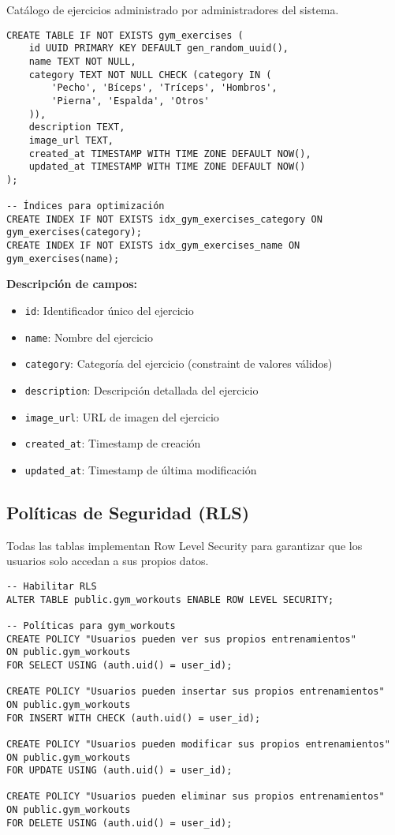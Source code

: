\documentclass[12pt,a4paper]{article}
\begin{document}
Catálogo de ejercicios administrado por administradores del sistema.

\begin{lstlisting}[style=sqlstyle, caption=Estructura completa de gym_exercises]
CREATE TABLE IF NOT EXISTS gym_exercises (
    id UUID PRIMARY KEY DEFAULT gen_random_uuid(),
    name TEXT NOT NULL,
    category TEXT NOT NULL CHECK (category IN (
        'Pecho', 'Bíceps', 'Tríceps', 'Hombros', 
        'Pierna', 'Espalda', 'Otros'
    )),
    description TEXT,
    image_url TEXT,
    created_at TIMESTAMP WITH TIME ZONE DEFAULT NOW(),
    updated_at TIMESTAMP WITH TIME ZONE DEFAULT NOW()
);

-- Índices para optimización
CREATE INDEX IF NOT EXISTS idx_gym_exercises_category ON gym_exercises(category);
CREATE INDEX IF NOT EXISTS idx_gym_exercises_name ON gym_exercises(name);
\end{lstlisting}

\textbf{Descripción de campos:}
\begin{itemize}
    \item \texttt{id}: Identificador único del ejercicio
    \item \texttt{name}: Nombre del ejercicio
    \item \texttt{category}: Categoría del ejercicio (constraint de valores válidos)
    \item \texttt{description}: Descripción detallada del ejercicio
    \item \texttt{image\_url}: URL de imagen del ejercicio
    \item \texttt{created\_at}: Timestamp de creación
    \item \texttt{updated\_at}: Timestamp de última modificación
\end{itemize}

\subsection{Políticas de Seguridad (RLS)}

Todas las tablas implementan Row Level Security para garantizar que los usuarios solo accedan a sus propios datos.

\begin{lstlisting}[style=sqlstyle, caption=Políticas RLS para gym_workouts]
-- Habilitar RLS
ALTER TABLE public.gym_workouts ENABLE ROW LEVEL SECURITY;

-- Políticas para gym_workouts
CREATE POLICY "Usuarios pueden ver sus propios entrenamientos"
ON public.gym_workouts
FOR SELECT USING (auth.uid() = user_id);

CREATE POLICY "Usuarios pueden insertar sus propios entrenamientos"
ON public.gym_workouts
FOR INSERT WITH CHECK (auth.uid() = user_id);

CREATE POLICY "Usuarios pueden modificar sus propios entrenamientos"
ON public.gym_workouts
FOR UPDATE USING (auth.uid() = user_id);

CREATE POLICY "Usuarios pueden eliminar sus propios entrenamientos"
ON public.gym_workouts
FOR DELETE USING (auth.uid() = user_id);
\end{lstlisting}
\end{document}
